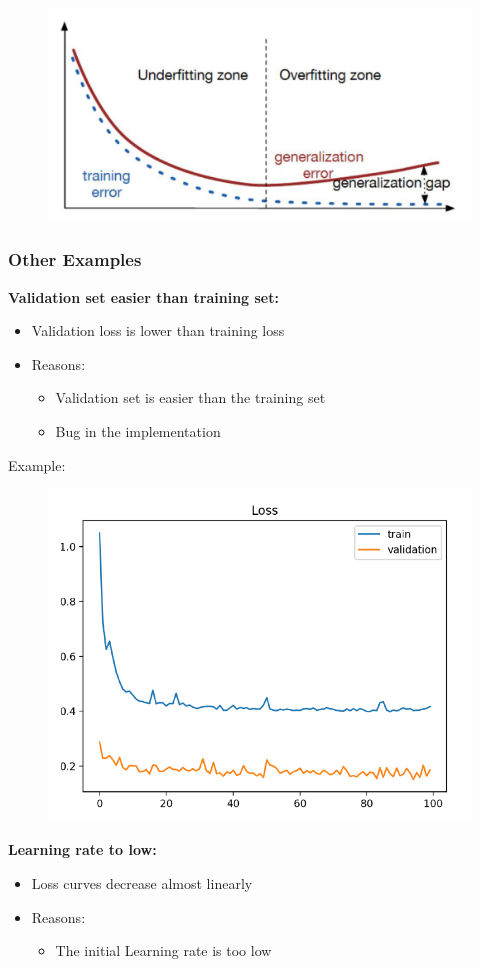 \documentclass[10pt,a4paper]{article}
\newcommand{\props}{$\circ$}
\newcommand{\iprops}{\item[\props]}
\begin{document}
\begin{figure}[H]
	\includegraphics[width=0.7\columnwidth]{figures/graph_underOverfitting.png}
\end{figure}

\subsubsection{Other Examples}
\textbf{Validation set easier than training set:}
\begin{itemize}
	\item Validation loss is lower than training loss
	\iprops Reasons:
	\begin{itemize}
		\item Validation set is easier than the training set
		\item Bug in the implementation
	\end{itemize}
\end{itemize}

Example:
\begin{figure}[H]
	\includegraphics[width=0.5\columnwidth]{figures/graph_val_easy.png}
\end{figure}

\textbf{Learning rate to low:}
\begin{itemize}
	\item Loss curves decrease almost linearly
	\iprops Reasons:
	\begin{itemize}
		\item The initial Learning rate is too low
	\end{itemize}
\end{itemize}
\end{document}
